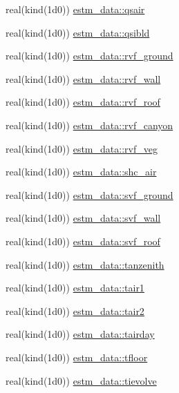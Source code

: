 \begin{DoxyCompactItemize}
\item 
real(kind(1d0)) \hyperlink{namespaceestm__data_ae795d432550126e53ae2b5d23aa201ee}{estm\+\_\+data\+::qsair}
\item 
real(kind(1d0)) \hyperlink{namespaceestm__data_a8ff592c60b4e732443fd36c877a550bf}{estm\+\_\+data\+::qsibld}
\item 
real(kind(1d0)) \hyperlink{namespaceestm__data_a92e6dde87beb4b135989c014c954724d}{estm\+\_\+data\+::rvf\+\_\+ground}
\item 
real(kind(1d0)) \hyperlink{namespaceestm__data_afe15d5484c54bc270928313b67cd282f}{estm\+\_\+data\+::rvf\+\_\+wall}
\item 
real(kind(1d0)) \hyperlink{namespaceestm__data_a3501ea07273d6456cdc4fedd9b771d6d}{estm\+\_\+data\+::rvf\+\_\+roof}
\item 
real(kind(1d0)) \hyperlink{namespaceestm__data_aee07cb5c857d8a1e88758c8917f30a9d}{estm\+\_\+data\+::rvf\+\_\+canyon}
\item 
real(kind(1d0)) \hyperlink{namespaceestm__data_ab7bfb1808a01900faec78277f5baab8e}{estm\+\_\+data\+::rvf\+\_\+veg}
\item 
real(kind(1d0)) \hyperlink{namespaceestm__data_a7a061270d21a36b76485b8f10b9e2180}{estm\+\_\+data\+::shc\+\_\+air}
\item 
real(kind(1d0)) \hyperlink{namespaceestm__data_afd27c2534f1d97d23367fc2b4203e4f7}{estm\+\_\+data\+::svf\+\_\+ground}
\item 
real(kind(1d0)) \hyperlink{namespaceestm__data_ac1d0eaab6bd3fd1a3a65ad825490f404}{estm\+\_\+data\+::svf\+\_\+wall}
\item 
real(kind(1d0)) \hyperlink{namespaceestm__data_ae568b13ec9ad1aad863dfe2b54d4d695}{estm\+\_\+data\+::svf\+\_\+roof}
\item 
real(kind(1d0)) \hyperlink{namespaceestm__data_a6f163e79efdc616eef7a91dee109f9a0}{estm\+\_\+data\+::tanzenith}
\item 
real(kind(1d0)) \hyperlink{namespaceestm__data_a48baf6ba495e6fa5d691bb962487261e}{estm\+\_\+data\+::tair1}
\item 
real(kind(1d0)) \hyperlink{namespaceestm__data_abcdcb259b4b85afcdb4ff0adb03940ca}{estm\+\_\+data\+::tair2}
\item 
real(kind(1d0)) \hyperlink{namespaceestm__data_a7c4bbc32ea4b8646912a7418623e1522}{estm\+\_\+data\+::tairday}
\item 
real(kind(1d0)) \hyperlink{namespaceestm__data_aa876704e968921da60f59a48ed4b1280}{estm\+\_\+data\+::tfloor}
\item 
real(kind(1d0)) \hyperlink{namespaceestm__data_a687144263fbc75d151299c74dba252b9}{estm\+\_\+data\+::tievolve}

\end{DoxyCompactItemize}
